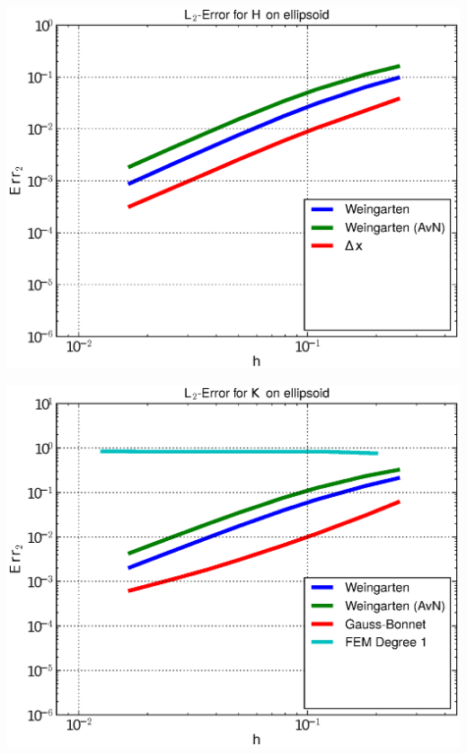 \documentclass{beamer}
\begin{document}
\begin{frame}
\begin{overprint}
\begin{minipage}[t]{0.49\textwidth}
            \centering\includegraphics[width=\textwidth]{bilder/Curvature/heineC/ErrHL2_3.eps}
          \end{minipage}
          \begin{minipage}[t]{0.49\textwidth}
            \centering\includegraphics[width=\textwidth]{bilder/Curvature/heineC/ErrKL2_4.eps}
          \end{minipage}\hfill
          \begin{minipage}[t]{0.49\textwidth}

\end{minipage}
\end{overprint}
\end{frame}
\end{document}
